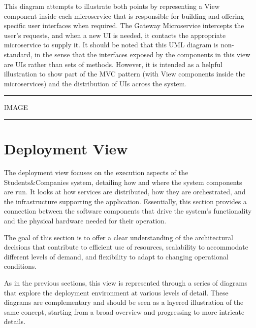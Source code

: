 This diagram attempts to illustrate both points by representing a View component inside each microservice that is responsible for building and offering specific user interfaces when required. The Gateway Microservice intercepts the user's requests, and when a new UI is needed, it contacts the appropriate microservice to supply it. It should be noted that this UML diagram is non-standard, in the sense that the interfaces exposed by the components in this view are UIs rather than sets of methods. However, it is intended as a helpful illustration to show part of the MVC pattern (with View components inside the microservices) and the distribution of UIs across the system.

\vspace{20pt}
\hrule
\vspace{10pt}
IMAGE
\vspace{10pt}
\hrule
\vspace{20pt}

\section{Deployment View}

The deployment view focuses on the execution aspects of the Students\&Companies system, detailing how and where the system components are run. It looks at how services are distributed, how they are orchestrated, and the infrastructure supporting the application. Essentially, this section provides a connection between the software components that drive the system's functionality and the physical hardware needed for their operation.

The goal of this section is to offer a clear understanding of the architectural decisions that contribute to efficient use of resources, scalability to accommodate different levels of demand, and flexibility to adapt to changing operational conditions.

As in the previous sections, this view is represented through a series of diagrams that explore the deployment environment at various levels of detail. These diagrams are complementary and should be seen as a layered illustration of the same concept, starting from a broad overview and progressing to more intricate details.

